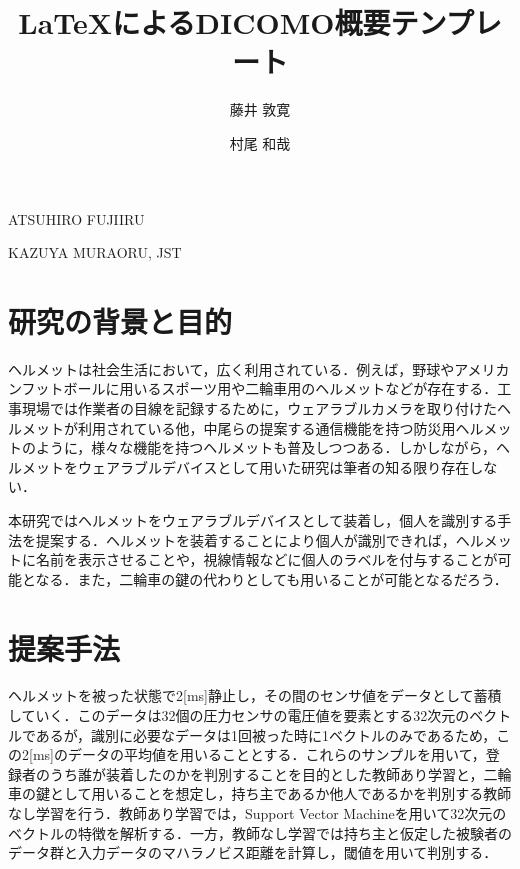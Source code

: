 \documentclass[Japanese,noauthor]{dicomopapers}
\begin{document}
\title{{\LaTeX}によるDICOMO概要テンプレート}



\author{藤井 敦寛}{ATSUHIRO FUJII}{RU}
\author{村尾 和哉}{KAZUYA MURAO}{RU, JST}

\maketitle

\section{研究の背景と目的}
ヘルメットは社会生活において，広く利用されている．例えば，野球やアメリカンフットボールに用いるスポーツ用や二輪車用のヘルメットなどが存在する．工事現場では作業者の目線を記録するために，ウェアラブルカメラを取り付けたヘルメットが利用されている他，中尾ら\cite{disaster}の提案する通信機能を持つ防災用ヘルメットのように，様々な機能を持つヘルメットも普及しつつある．しかしながら，ヘルメットをウェアラブルデバイスとして用いた研究は筆者の知る限り存在しない．\par
本研究ではヘルメットをウェアラブルデバイスとして装着し，個人を識別する手法を提案する．ヘルメットを装着することにより個人が識別できれば，ヘルメットに名前を表示させることや，視線情報などに個人のラベルを付与することが可能となる．また，二輪車の鍵の代わりとしても用いることが可能となるだろう．

\section{提案手法}
ヘルメットを被った状態で2[ms]静止し，その間のセンサ値をデータとして蓄積していく．このデータは32個の圧力センサの電圧値を要素とする32次元のベクトルであるが，識別に必要なデータは1回被った時に1ベクトルのみであるため，この2[ms]のデータの平均値を用いることとする．これらのサンプルを用いて，登録者のうち誰が装着したのかを判別することを目的とした教師あり学習と，二輪車の鍵として用いることを想定し，持ち主であるか他人であるかを判別する教師なし学習を行う．教師あり学習では，Support Vector Machineを用いて32次元のベクトルの特徴を解析する．一方，教師なし学習では持ち主と仮定した被験者のデータ群と入力データのマハラノビス距離を計算し，閾値を用いて判別する．
\end{document}
